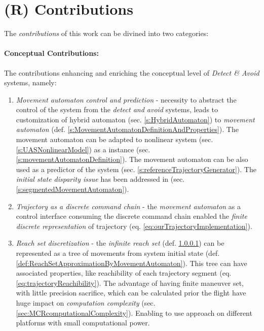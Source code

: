 \section{(R) Contributions}\label{s:Contributions} 
\noindent The \emph{contributions} of this work can be divined into two categories:
    
\paragraph{Conceptual Contributions:} The contributions enhancing and enriching the conceptual level of \emph{Detect \& Avoid} systems, namely:

\begin{enumerate}
    \item \emph{Movement automaton control and prediction} -  necessity to abstract the control of the system from the \emph{detect and avoid} systems, leads to customization of hybrid automaton (sec. \ref{s:HybridAutomaton}) to \emph{movement automaton} (def. \ref{s:MovementAutomatonDefinitionAndProperties}). The movement automaton can be adapted to nonlinear system (sec. \ref{s:UASNonlinearModel}) as a instance (sec. \ref{s:movementAutomatonDefinition}). The movement automaton can be also used as a predictor of the system (sec. \ref{s:referenceTrajectoryGenerator}). The \emph{initial state disparity issue} \cite{gomola2017obstacle} has been addressed in (sec. \ref{s:segmentedMovementAutomaton}).
    
    \item \emph{Trajectory as a discrete command chain} -  the \emph{movement automaton} as a control interface consuming the discrete command chain enabled the \emph{finite discrete representation} of trajectory (eq. \ref{eq:ourTrajectoryImplementation}).
    
    \item \emph{Reach set discretization} - the \emph{infinite reach set} (def. \ref{}) can be represented as a tree of movements from system initial state (def. \ref{def:ReachSetApproximationByMovementAutomaton}). This tree can have associated properties, like reachibility of each trajectory segment (eq. \ref{eq:trajectoryReachibility}).  The advantage of having finite maneuver set, with little precision sacrifice, which can be calculated prior the flight have huge impact on \emph{computation complexity} (sec. \ref{sec:MCRcomputationalComplexity}). Enabling to use approach on different platforms with small computational power. 
    

\end{enumerate}
